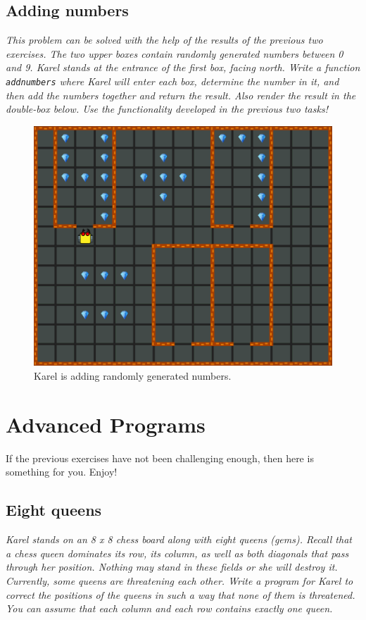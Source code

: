 {{\subsection{Adding numbers}

\noindent
{\em This problem can be solved with the help of the results 
of the previous two exercises.
The two upper boxes contain randomly generated numbers between 0 and 9. Karel stands at the entrance of the first box,
facing north. Write a function {\tt addnumbers} where Karel will enter each box, determine the number in it,
and then add the numbers together and return the result. Also render the result in the double-box below. 
Use the functionality developed in the previous two tasks!}


\begin{figure}[!ht]
\begin{center}
\includegraphics[height=0.4\textwidth]{img/i03.png}
\end{center}
\vspace{-4mm}
\caption{Karel is adding randomly generated numbers.}
\label{fig:g12}
\end{figure}


\section{Advanced Programs}

If the previous exercises have not been challenging enough, then here is something 
for you. Enjoy!

\subsection{Eight queens}

\noindent
{\em Karel stands on an 8 x 8 chess board along with eight queens (gems). Recall that a chess queen dominates its row, its column, as well as both diagonals that pass through her position. Nothing may stand in these fields or she will destroy it. Currently, some queens are threatening each other. Write a program for Karel to correct the positions of the queens in such a way that none of them is threatened. You can assume that each column and each row contains exactly one queen. }

}}
